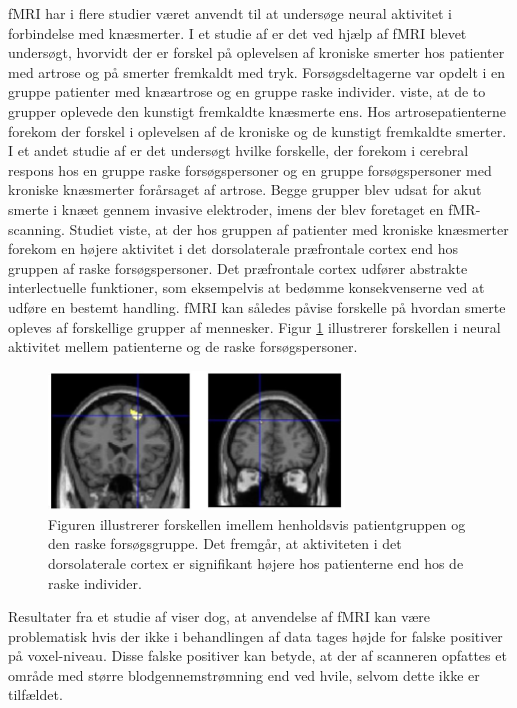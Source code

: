 fMRI har i flere studier været anvendt til at undersøge neural aktivitet i forbindelse med knæsmerter.
I et studie af  er det ved hjælp af fMRI blevet undersøgt, hvorvidt der er forskel på oplevelsen af kroniske smerter hos patienter med artrose og på smerter fremkaldt med tryk. Forsøgsdeltagerne var opdelt i en gruppe patienter med knæartrose og en gruppe raske individer.  viste, at de to grupper oplevede den kunstigt fremkaldte knæsmerte ens. Hos artrosepatienterne forekom der forskel i oplevelsen af de kroniske og de kunstigt fremkaldte smerter. \citep{Parks2012}\\ 
I et andet studie af  er det undersøgt hvilke forskelle, der forekom i cerebral respons hos en gruppe raske forsøgspersoner og en gruppe forsøgspersoner med kroniske knæsmerter forårsaget af artrose. Begge grupper blev udsat for akut smerte i knæet gennem invasive elektroder, imens der blev foretaget en fMR-scanning. Studiet viste, at der hos gruppen af patienter med kroniske knæsmerter forekom en højere aktivitet i det dorsolaterale præfrontale cortex end hos gruppen af raske forsøgspersoner. \citep{Hiramatsu2014} Det præfrontale cortex udfører abstrakte interlectuelle funktioner, som eksempelvis at bedømme konsekvenserne ved at udføre en bestemt handling. \citep{Martini}
fMRI kan således påvise forskelle på hvordan smerte opleves af forskellige grupper af mennesker. Figur \ref{fig:fMRI_result} illustrerer forskellen i neural aktivitet mellem patienterne og de raske forsøgspersoner.
\begin{figure}[H] 
	\begin{center}
		\includegraphics[width=0.7\textwidth]{figures/bProblemanalyse/fMRI_dorsolateral}
	\end{center}
	\caption{Figuren illustrerer forskellen imellem henholdsvis patientgruppen og den raske forsøgsgruppe. Det fremgår, at aktiviteten i det dorsolaterale cortex er signifikant højere hos patienterne end hos de raske individer. \citep{Hiramatsu2014}} 
	\label{fig:fMRI_result} 
\end{figure} 
Resultater fra et studie af  viser dog, at anvendelse af fMRI kan være problematisk hvis der ikke i behandlingen af data tages højde for falske positiver på voxel-niveau. Disse falske positiver kan betyde, at der af scanneren opfattes et område med større blodgennemstrømning end ved hvile, selvom dette ikke er tilfældet. \citep{Bennet2011} 

